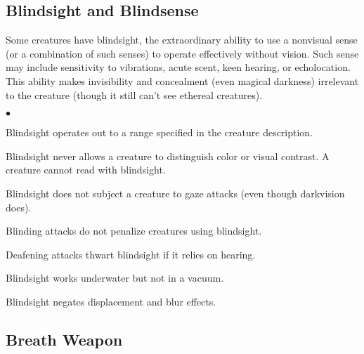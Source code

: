 \subsection{Blindsight and Blindsense}

Some creatures have blindsight, the extraordinary ability to use a nonvisual sense (or a combination of such senses) to operate effectively without vision. Such sense may include sensitivity to vibrations, acute scent, keen hearing, or echolocation. This ability makes invisibility and concealment (even magical darkness) irrelevant to the creature (though it still can't see ethereal creatures). 

\begin{list}{$\bullet$}{\itemspace}
	\item Blindsight operates out to a range specified in the creature description.
	\item Blindsight never allows a creature to distinguish color or visual contrast. A creature cannot read with blindsight.
	\item Blindsight does not subject a creature to gaze attacks (even though darkvision does).
	\item Blinding attacks do not penalize creatures using blindsight. 
	\item Deafening attacks thwart blindsight if it relies on hearing.
	\item Blindsight works underwater but not in a vacuum.
	\item Blindsight negates displacement and blur effects.
\end{list}
	

\subsection{Breath Weapon}

